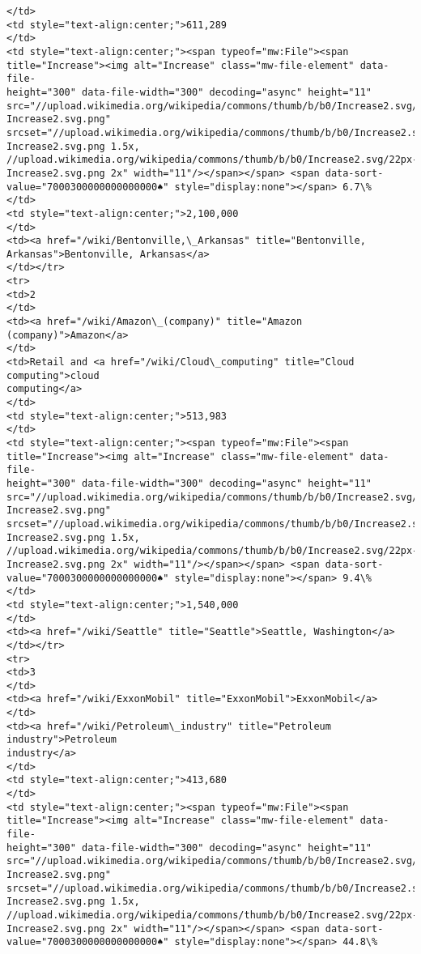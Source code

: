 \documentclass[11pt]{article}
\begin{document}
\begin{Verbatim}[commandchars=\\\{\}]
</td>
<td style="text-align:center;">611,289
</td>
<td style="text-align:center;"><span typeof="mw:File"><span
title="Increase"><img alt="Increase" class="mw-file-element" data-file-
height="300" data-file-width="300" decoding="async" height="11"
src="//upload.wikimedia.org/wikipedia/commons/thumb/b/b0/Increase2.svg/11px-
Increase2.svg.png"
srcset="//upload.wikimedia.org/wikipedia/commons/thumb/b/b0/Increase2.svg/17px-
Increase2.svg.png 1.5x,
//upload.wikimedia.org/wikipedia/commons/thumb/b/b0/Increase2.svg/22px-
Increase2.svg.png 2x" width="11"/></span></span> <span data-sort-
value="7000300000000000000♠" style="display:none"></span> 6.7\%
</td>
<td style="text-align:center;">2,100,000
</td>
<td><a href="/wiki/Bentonville,\_Arkansas" title="Bentonville,
Arkansas">Bentonville, Arkansas</a>
</td></tr>
<tr>
<td>2
</td>
<td><a href="/wiki/Amazon\_(company)" title="Amazon (company)">Amazon</a>
</td>
<td>Retail and <a href="/wiki/Cloud\_computing" title="Cloud computing">cloud
computing</a>
</td>
<td style="text-align:center;">513,983
</td>
<td style="text-align:center;"><span typeof="mw:File"><span
title="Increase"><img alt="Increase" class="mw-file-element" data-file-
height="300" data-file-width="300" decoding="async" height="11"
src="//upload.wikimedia.org/wikipedia/commons/thumb/b/b0/Increase2.svg/11px-
Increase2.svg.png"
srcset="//upload.wikimedia.org/wikipedia/commons/thumb/b/b0/Increase2.svg/17px-
Increase2.svg.png 1.5x,
//upload.wikimedia.org/wikipedia/commons/thumb/b/b0/Increase2.svg/22px-
Increase2.svg.png 2x" width="11"/></span></span> <span data-sort-
value="7000300000000000000♠" style="display:none"></span> 9.4\%
</td>
<td style="text-align:center;">1,540,000
</td>
<td><a href="/wiki/Seattle" title="Seattle">Seattle, Washington</a>
</td></tr>
<tr>
<td>3
</td>
<td><a href="/wiki/ExxonMobil" title="ExxonMobil">ExxonMobil</a>
</td>
<td><a href="/wiki/Petroleum\_industry" title="Petroleum industry">Petroleum
industry</a>
</td>
<td style="text-align:center;">413,680
</td>
<td style="text-align:center;"><span typeof="mw:File"><span
title="Increase"><img alt="Increase" class="mw-file-element" data-file-
height="300" data-file-width="300" decoding="async" height="11"
src="//upload.wikimedia.org/wikipedia/commons/thumb/b/b0/Increase2.svg/11px-
Increase2.svg.png"
srcset="//upload.wikimedia.org/wikipedia/commons/thumb/b/b0/Increase2.svg/17px-
Increase2.svg.png 1.5x,
//upload.wikimedia.org/wikipedia/commons/thumb/b/b0/Increase2.svg/22px-
Increase2.svg.png 2x" width="11"/></span></span> <span data-sort-
value="7000300000000000000♠" style="display:none"></span> 44.8\%

\end{Verbatim}
\end{document}
